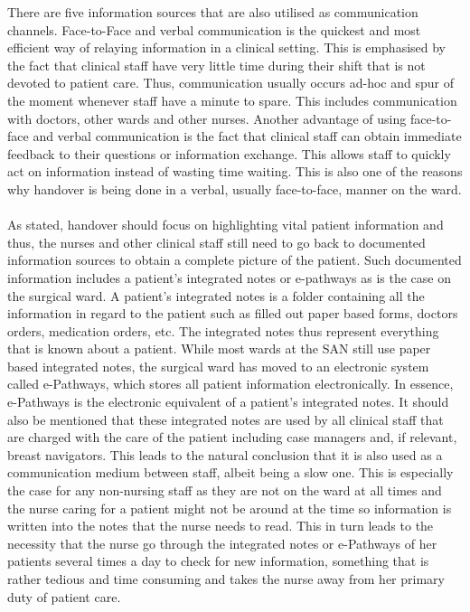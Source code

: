 \noindent There are five information sources that are also utilised as communication channels. Face-to-Face and verbal communication is the quickest and most efficient way of relaying information in a clinical setting. This is emphasised by the fact that clinical staff have very little time during their shift that is not devoted to patient care. Thus, communication usually occurs ad-hoc and spur of the moment whenever staff have a minute to spare. This includes communication with doctors, other wards and other nurses. Another advantage of using face-to-face and verbal communication is the fact that clinical staff can obtain immediate feedback to their questions or information exchange. This allows staff to quickly act on information instead of wasting time waiting. This is also one of the reasons why handover is being done in a verbal, usually face-to-face, manner on the ward. 
\\ \\
As stated, handover should focus on highlighting vital patient information and thus, the nurses and other clinical staff still need to go back to documented information sources to obtain a complete picture of the patient. Such documented information includes a patient's integrated notes or e-pathways as is the case on the surgical ward. A patient's integrated notes is a folder containing all the information in regard to the patient such as filled out paper based forms, doctors orders, medication orders, etc. The integrated notes thus represent everything that is known about a patient. While most wards at the SAN still use paper based integrated notes, the surgical ward has moved to an electronic system called e-Pathways, which stores all patient information electronically. In essence, e-Pathways is the electronic equivalent of a patient's integrated notes. It should also be mentioned that these integrated notes are used by all clinical staff that are charged with the care of the patient including case managers and, if relevant, breast navigators. This leads to the natural conclusion that it is also used as a communication medium between staff, albeit being a slow one. This is especially the case for any non-nursing staff as they are not on the ward at all times and the nurse caring for a patient might not be around at the time so information is written into the notes that the nurse needs to read. This in turn leads to the necessity that the nurse go through the integrated notes or e-Pathways of her patients several times a day to check for new information, something that is rather tedious and time consuming and takes the nurse away from her primary duty of patient care.

